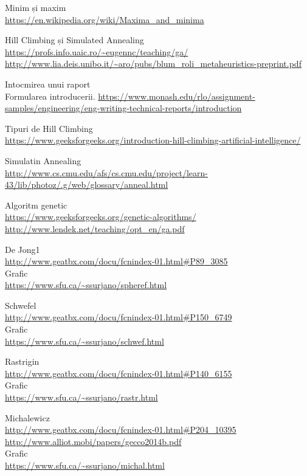 \documentclass{article}
\begin{document}
\begin{thebibliography}{9}

  Minim și maxim\\
  \url{https://en.wikipedia.org/wiki/Maxima_and_minima}

  Hill Climbing și Simulated Annealing\\
  \url{https://profs.info.uaic.ro/~eugennc/teaching/ga/}\\
  \url{http://www.lia.deis.unibo.it/~aro/pubs/blum_roli_metaheuristics-preprint.pdf}
  
  \begin{flushleft}
  Intocmirea unui raport \\ Formularea introducerii.
  \url{https://www.monash.edu/rlo/assignment-samples/engineering/eng-writing-technical-reports/introduction}
  \end{flushleft}
  
  Tipuri de Hill Climbing\\
  \url{https://www.geeksforgeeks.org/introduction-hill-climbing-artificial-intelligence/}
  
  Simulatin Annealing\\
  \url{http://www.cs.cmu.edu/afs/cs.cmu.edu/project/learn-43/lib/photoz/.g/web/glossary/anneal.html}
  
  Algoritm genetic\\
  \url{https://www.geeksforgeeks.org/genetic-algorithms/}\\
  \url{http://www.lendek.net/teaching/opt_en/ga.pdf}
  
  De Jong1\\
  \url{http://www.geatbx.com/docu/fcnindex-01.html#P89_3085}\\
  Grafic\\
\url{https://www.sfu.ca/~ssurjano/spheref.html}
  
  Schwefel\\
  \url{http://www.geatbx.com/docu/fcnindex-01.html#P150_6749}\\
    Grafic\\
\url{https://www.sfu.ca/~ssurjano/schwef.html}
  
  Rastrigin\\
  \url{http://www.geatbx.com/docu/fcnindex-01.html#P140_6155}\\
    Grafic\\
\url{https://www.sfu.ca/~ssurjano/rastr.html}
  
  Michalewicz\\
  \url{http://www.geatbx.com/docu/fcnindex-01.html#P204_10395}\\
  \url{http://www.alliot.mobi/papers/gecco2014b.pdf}\\
    Grafic\\
\url{https://www.sfu.ca/~ssurjano/michal.html}
  
  
\end{thebibliography}  
\end{document}
